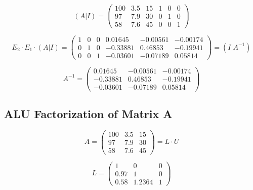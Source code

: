 \begin{equation}
    \left( A | I \right) = \left( \begin{array}{ccc|ccc}
        100 & 3.5 & 15 & 1 & 0 & 0 \\
        97 & 7.9 & 30 & 0 & 1 & 0 \\
        58 & 7.6 & 45 & 0 & 0 & 1
    \end{array} \right)
\end{equation}

\begin{equation}
    E_2 \cdot E_1 \cdot \left( A | I \right) = \left( \begin{array}{ccc|ccc}
        1 & 0 & 0 & 0.01645 & -0.00561 & -0.00174 \\
        0 & 1 & 0 & -0.33881 & 0.46853 & -0.19941 \\
        0 & 0 & 1 & -0.03601 & -0.07189 & 0.05814
    \end{array} \right) = \left( I | A^{-1} \right)
\end{equation}

\begin{equation}
    A^{-1} = \begin{pmatrix}
        0.01645 & -0.00561 & -0.00174 \\
        -0.33881 & 0.46853 & -0.19941 \\
        -0.03601 & -0.07189 & 0.05814
    \end{pmatrix}
\end{equation}

\newpage
\thispagestyle{plain}

\subsection{ALU Factorization of Matrix A}
\begin{equation}
    A = \begin{pmatrix}
        100 & 3.5 & 15 \\
        97 & 7.9 & 30 \\
        58 & 7.6 & 45
    \end{pmatrix} = L \cdot U
\end{equation}

\begin{equation}
    L = \begin{pmatrix}
        1 & 0 & 0 \\
        0.97 & 1 & 0 \\
        0.58 & 1.2364 & 1
    \end{pmatrix}
\end{equation}

